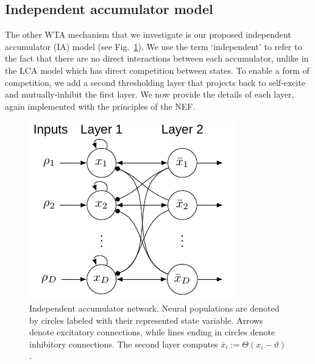 \documentclass[10pt,letterpaper]{article}
\begin{document}
\subsection{Independent accumulator model}
The other WTA mechanism that we investigate is our proposed independent accumulator (IA) model (see Fig.~\ref{fig:ia-sketch}).
We use the term `independent' to refer to the fact that there are no direct interactions between each accumulator, unlike in the LCA model which has direct competition between states.
To enable a form of competition, we add a second thresholding layer that  projects back to self-excite and mutually-inhibit the first layer.
We now provide the details of each layer, again implemented with the principles of the NEF\@.
\begin{figure}
    \centering
    \includegraphics{figures/ia-sketch}
    \caption{
        Independent accumulator network.
        Neural populations are denoted by circles labeled with their represented state variable.
        Arrows denote excitatory connections, while lines ending in circles denote inhibitory connections.
        The second layer computes $\bar{x}_i := \Theta(x_i - \vartheta)$.
    }\label{fig:ia-sketch}
\end{figure}
\end{document}
